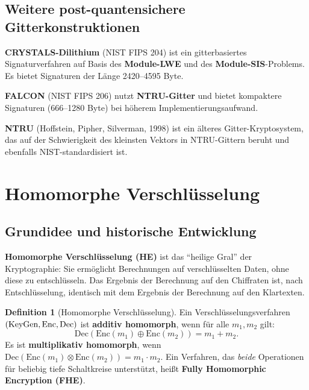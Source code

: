 ﻿\documentclass[a4paper,12pt]{scrreprt}
\theoremstyle{definition}
\newtheorem{definition}{Definition}[section]
\begin{document}
\subsection{Weitere post-quantensichere Gitterkonstruktionen}

\textbf{CRYSTALS-Dilithium} (NIST FIPS 204) ist ein gitterbasiertes Signaturverfahren auf Basis des \textbf{Module-LWE} und des \textbf{Module-SIS}-Problems. Es bietet Signaturen der Länge 2420--4595 Byte.

\textbf{FALCON} (NIST FIPS 206) nutzt \textbf{NTRU-Gitter} und bietet kompaktere Signaturen (666--1280 Byte) bei höherem Implementierungsaufwand.

\textbf{NTRU} (Hoffstein, Pipher, Silverman, 1998) ist ein älteres Gitter-Kryptosystem, das auf der Schwierigkeit des kleinsten Vektors in NTRU-Gittern beruht und ebenfalls NIST-standardisiert ist.

\section{Homomorphe Verschlüsselung}

\subsection{Grundidee und historische Entwicklung}

\textbf{Homomorphe Verschlüsselung (HE)} ist das ``heilige Gral'' der Kryptographie: Sie ermöglicht Berechnungen auf verschlüsselten Daten, ohne diese zu entschlüsseln. Das Ergebnis der Berechnung auf den Chiffraten ist, nach Entschlüsselung, identisch mit dem Ergebnis der Berechnung auf den Klartexten.

\begin{definition}[Homomorphe Verschlüsselung]
Ein Verschlüsselungsverfahren $(\mathrm{KeyGen},  \newline \mathrm{Enc}, \mathrm{Dec})$ ist \textbf{additiv homomorph}, wenn für alle $m_1, m_2$ gilt:
\[
\mathrm{Dec}(\mathrm{Enc}(m_1) \oplus \mathrm{Enc}(m_2)) = m_1 + m_2.
\]
Es ist \textbf{multiplikativ homomorph}, wenn $\mathrm{Dec}(\mathrm{Enc}(m_1) \otimes \mathrm{Enc}(m_2)) = m_1 \cdot m_2$. Ein Verfahren, das \emph{beide} Operationen für beliebig tiefe Schaltkreise unterstützt, heißt \textbf{Fully Homomorphic Encryption (FHE)}.
\end{definition}
\end{document}
